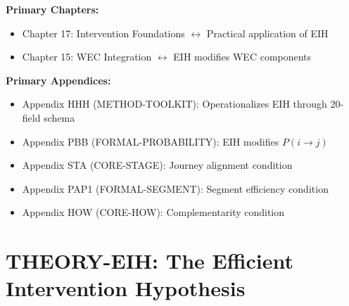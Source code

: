 \begin{tcolorbox}[colback=purple!5!white, colframe=purple!75!black,
    title=Chapter Linkage]

\textbf{Primary Chapters:}
\begin{itemize}[nosep]
\item Chapter 17: Intervention Foundations $\leftrightarrow$ Practical application of EIH
\item Chapter 15: WEC Integration $\leftrightarrow$ EIH modifies WEC components
\end{itemize}

\textbf{Primary Appendices:}
\begin{itemize}[nosep]
\item Appendix HHH (METHOD-TOOLKIT): Operationalizes EIH through 20-field schema
\item Appendix PBB (FORMAL-PROBABILITY): EIH modifies $P(i \to j)$
\item Appendix STA (CORE-STAGE): Journey alignment condition
\item Appendix PAP1 (FORMAL-SEGMENT): Segment efficiency condition
\item Appendix HOW (CORE-HOW): Complementarity condition
\end{itemize}

\end{tcolorbox}


\chapter{THEORY-EIH: The Efficient Intervention Hypothesis}
\label{app:theory-eih}


\begin{abstract}
Why do most behavioral interventions underperform expectations? This appendix
proposes a formal answer: the \textbf{Efficient Intervention Hypothesis (EIH)}.
We prove that intervention effectiveness is bounded by three alignment conditions:
journey phase alignment ($\mu$), segment fit ($\sigma$), and portfolio complementarity
($\gamma$). An intervention achieves its theoretical maximum only when all three
conditions are satisfied simultaneously. Violations explain the systematic 60-70\%
underperformance observed in applied behavioral science. The EIH provides testable
predictions and a normative framework for intervention design.
\end{abstract}

